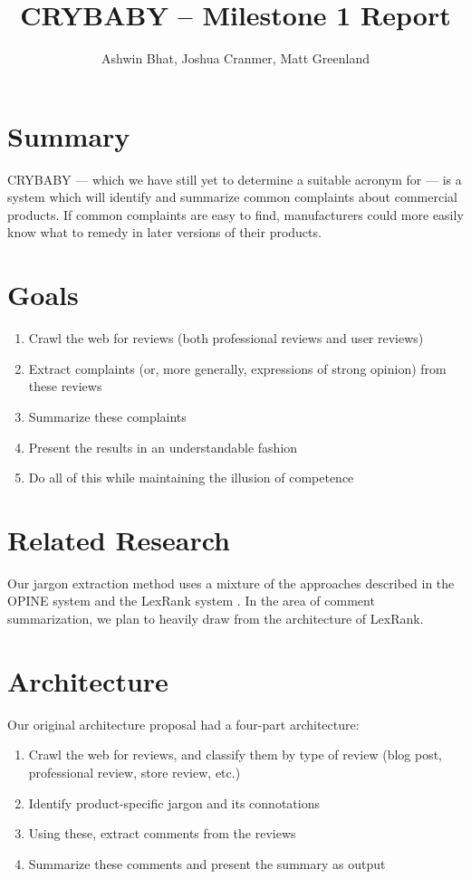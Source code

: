 \documentclass{article}
\title{CRYBABY -- Milestone 1 Report}
\author{Ashwin Bhat, Joshua Cranmer, Matt Greenland}
\begin{document}
\maketitle
\tableofcontents
\section{Summary}
CRYBABY --- which we have still yet to determine a suitable acronym for --- is a
system which will identify and summarize common complaints about commercial
products. If common complaints are easy to find, manufacturers could more
easily know what to remedy in later versions of their products.

\section{Goals}
\begin{enumerate}
\item Crawl the web for reviews (both professional reviews and user reviews)
\item Extract complaints (or, more generally, expressions of strong opinion)
from these reviews
\item Summarize these complaints
\item Present the results in an understandable fashion
\item Do all of this while maintaining the illusion of competence
\end{enumerate}

\section{Related Research}
Our jargon extraction method uses a mixture of the approaches described in the OPINE system \cite{opine} and the LexRank system \cite{lexrank}.  In the area of comment summarization, we plan to heavily draw from the
architecture of LexRank.

\section{Architecture}
Our original architecture proposal had a four-part architecture:
\begin{enumerate}
\item Crawl the web for reviews, and classify them by type of review
(blog post, professional review, store review, etc.)
\item Identify product-specific jargon and its connotations
\item Using these, extract comments from the reviews
\item Summarize these comments and present the summary as output
\end{enumerate}
\end{document}

